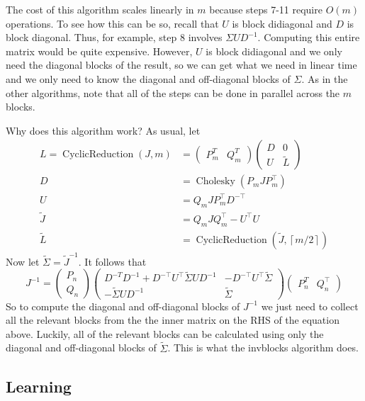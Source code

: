 \documentclass{article}
\theoremstyle{definition}
\DeclareMathOperator{\CyclicReduction}{CyclicReduction}
\DeclareMathOperator{\chol}{Cholesky}
\begin{document}
The cost of this algorithm scales linearly in $m$ because steps 7-11 require $O(m)$ operations.  To see how this can be so, recall that $U$ is block didiagonal and $D$ is block diagonal.  Thus, for example, step 8 involves $\Sigma U D^{-1}$.   Computing this entire matrix would be quite expensive.  However, $U$ is block didiagonal and we only need the diagonal blocks of the result, so we can get what we need in linear time and we only need to know the diagonal and off-diagonal blocks of $\Sigma$.  As in the other algorithms, note that all of the steps can be done in parallel across the $m$ blocks.

Why does this algorithm work?  As usual, let
\begin{align*}
L=\CyclicReduction\left(J,m\right) & =\left(\begin{array}{cc}
P_{m}^{T} & Q_{m}^{T}\end{array}\right)\left(\begin{array}{cc}
D & 0\\
U & \tilde L
\end{array}\right)\\
D & =\chol\left(P_{m}JP_{m}^{\top}\right)\\
U & =Q_{m}JP_{m}^{\top}D^{-\top}\\
\tilde{J} & =Q_{m}JQ_{m}^{\top}-U^{\top}U\\
\tilde{L} &= \CyclicReduction\left(\tilde{J},\left\lceil m/2\right\rceil \right)
\end{align*}
Now let $\tilde \Sigma = \tilde J^{-1}$.  It follows that 
\[
J^{-1} = \left(\begin{array}{c}
P_{n}\\
Q_{n}
\end{array}\right)\left(\begin{array}{cc}
D^{-T}D^{-1}+D^{-\top}U^{\top}\tilde{\Sigma}UD^{-1} & -D^{-\top}U^{\top}\tilde{\Sigma}\\
-\tilde{\Sigma}UD^{-1} & \tilde{\Sigma}
\end{array}\right)\left(\begin{array}{cc}
P_{n}^{T} & Q_{n}^{\top}\end{array}\right)
\]
So to compute the diagonal and off-diagonal blocks of $J^{-1}$ we just need to collect all the relevant blocks from the the inner matrix on the RHS of the equation above.  Luckily, all of the relevant blocks can be calculated using only the diagonal and off-diagonal blocks of $\tilde \Sigma$.  This is what the invblocks algorithm does.

\subsection{Learning}
\end{document}

